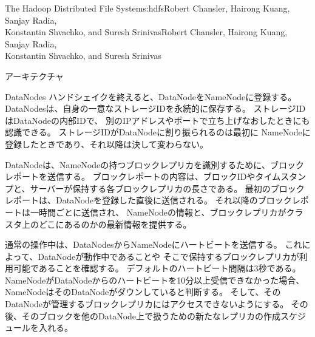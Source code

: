 \begin{aosachaptertoc}{The Hadoop Distributed File System}{s:hdfs}{Robert Chansler, Hairong Kuang, Sanjay Radia, \\ Konstantin Shvachko, and Suresh Srinivas}{Robert Chansler, Hairong Kuang, Sanjay Radia, \\ \hspace*{0.9cm} Konstantin Shvachko, and Suresh Srinivas}
\begin{aosasect1}{アーキテクチャ}
\begin{aosasect2}{DataNodes}
ハンドシェイクを終えると、DataNodeをNameNodeに登録する。
DataNodesは、自身の一意なストレージIDを永続的に保存する。
ストレージIDはDataNodeの内部IDで、
別のIPアドレスやポートで立ち上げなおしたときにも認識できる。
ストレージIDがDataNodeに割り振られるのは最初に
NameNodeに登録したときであり、それ以降は決して変わらない。

DataNodeは、NameNodeの持つブロックレプリカを識別するために、ブロックレポートを送信する。
ブロックレポートの内容は、ブロックIDやタイムスタンプと、サーバーが保持する各ブロックレプリカの長さである。
最初のブロックレポートは、DataNodeを登録した直後に送信される。
それ以降のブロックレポートは一時間ごとに送信され、
NameNodeの情報と、ブロックレプリカがクラスタ上のどこにあるのかの最新情報を提供する。

通常の操作中は、DataNodesからNameNodeにハートビートを送信する。
これによって、DataNodeが動作中であることや
そこで保持するブロックレプリカが利用可能であることを確認する。
デフォルトのハートビート間隔は3秒である。
NameNodeがDataNodeからのハートビートを10分以上受信できなかった場合、
NameNodeはそのDataNodeがダウンしていると判断する。
そして、そのDataNodeが管理するブロックレプリカにはアクセスできないようにする。
その後、そのブロックを他のDataNode上で扱うための新たなレプリカの作成スケジュールを入れる。


\end{aosasect2}
\end{aosasect1}
\end{aosachaptertoc}
